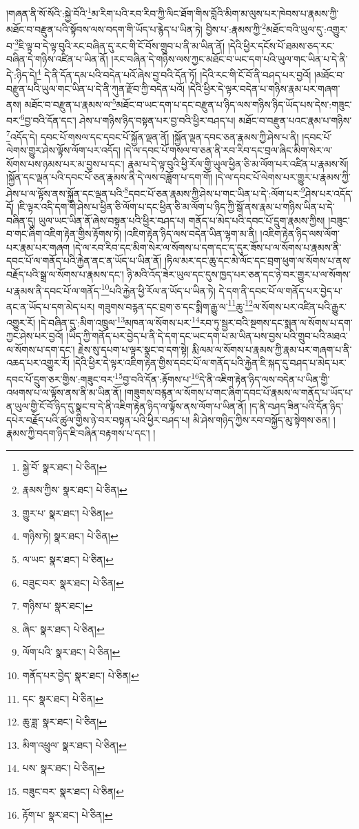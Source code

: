 །གཞན་ནི་སོ་སོའི་:སྐྱེ་བོའི་\footnote{སྐྱེ་བོ་  སྣར་ཐང་།  པེ་ཅིན། }མ་རིག་པའི་རབ་རིབ་ཀྱི་ལིང་ཐོག་གིས་བློའི་མིག་མ་ལུས་པར་ཁེབས་པ་རྣམས་ཀྱི་མཐོང་བ་བརྫུན་པའི་སྟོབས་ལས་བདག་གི་ཡོད་པ་རྙེད་པ་ཡིན་ཏེ། བྱིས་པ་:རྣམས་ཀྱི་\footnote{རྣམས་ཀྱིས་  སྣར་ཐང་།  པེ་ཅིན། }མཐོང་བའི་ཡུལ་དུ་:འགྱུར་བ་\footnote{གྱུར་པ་  སྣར་ཐང་།  པེ་ཅིན། }ཇི་ལྟ་བ་དེ་ལྟ་བུའི་རང་བཞིན་དུ་རང་གི་ངོ་བོས་གྲུབ་པ་ནི་མ་ཡིན་ནོ། །དེའི་ཕྱིར་དངོས་པོ་ཐམས་ཅད་རང་བཞིན་དེ་གཉིས་འཛིན་པ་ཡིན་ནོ། །རང་བཞིན་དེ་གཉིས་ལས་ཀྱང་མཐོང་བ་ཡང་དག་པའི་ཡུལ་གང་ཡིན་པ་དེ་ནི་དེ་:ཉིད་དེ།\footnote{གཉིས་ཏེ།  སྣར་ཐང་།  པེ་ཅིན། } དེ་ནི་དོན་དམ་པའི་བདེན་པའོ་ཞེས་བྱ་བའི་དོན་ཏོ། །དེའི་རང་གི་ངོ་བོ་ནི་བཤད་པར་བྱའོ། །མཐོང་བ་བརྫུན་པའི་ཡུལ་གང་ཡིན་པ་དེ་ནི་ཀུན་རྫོབ་ཀྱི་བདེན་པའོ། །དེའི་ཕྱིར་དེ་ལྟར་བདེན་པ་གཉིས་རྣམ་པར་གཞག་ནས། མཐོང་བ་བརྫུན་པ་རྣམས་ལ་\footnote{ལ་ཡང་  སྣར་ཐང་།  པེ་ཅིན། }མཐོང་བ་ཡང་དག་པ་དང་བརྫུན་པ་ཉིད་ལས་གཉིས་ཉིད་ཡོད་པས་དེས་:གཟུང་བར་\footnote{བཟུང་བར་  སྣར་ཐང་།  པེ་ཅིན། }བྱ་བའི་དོན་དང་། ཤེས་པ་གཉིས་ཉིད་བསྟན་པར་བྱ་བའི་ཕྱིར་བཤད་པ། མཐོང་བ་བརྫུན་པའང་རྣམ་པ་གཉིས་\footnote{གཉིས་པ་  སྣར་ཐང་། }འདོད་དེ། དབང་པོ་གསལ་དང་དབང་པོ་སྐྱོན་ལྡན་ནོ། །སྐྱོན་ལྡན་དབང་ཅན་རྣམས་ཀྱི་ཤེས་པ་ནི། །དབང་པོ་ལེགས་གྱུར་ཤེས་ལྟོས་ལོག་པར་འདོད། །དེ་ལ་དབང་པོ་གསལ་བ་ཅན་ནི་རབ་རིབ་དང་བྲལ་ཞིང་མིག་སེར་ལ་སོགས་པས་ཉམས་པར་མ་བྱས་པ་དང་། རྣམ་པ་དེ་ལྟ་བུའི་ཕྱི་རོལ་གྱི་ཡུལ་ཕྱིན་ཅི་མ་ལོག་པར་འཛིན་པ་རྣམས་སོ། །སྐྱོན་དང་ལྡན་པའི་དབང་པོ་ཅན་རྣམས་ནི་དེ་ལས་བཟློག་པ་དག་གོ། །དེ་ལ་དབང་པོ་ལེགས་པར་གྱུར་པ་རྣམས་ཀྱི་ཤེས་པ་ལ་ལྟོས་ནས་སྐྱོན་དང་ལྡན་པའི་\footnote{ཞིང་  སྣར་ཐང་།  པེ་ཅིན། }དབང་པོ་ཅན་རྣམས་ཀྱི་ཤེས་པ་གང་ཡིན་པ་དེ་:ལོག་པར་\footnote{ལོག་པའི་  སྣར་ཐང་།  པེ་ཅིན། }ཤེས་པར་འདོད་དོ། །ཇི་ལྟར་འདི་དག་གི་ཤེས་པ་ཕྱིན་ཅི་ལོག་པ་དང་ཕྱིན་ཅི་མ་ལོག་པ་ཉིད་ཀྱི་སྒོ་ནས་རྣམ་པ་གཉིས་ཡིན་པ་དེ་བཞིན་དུ། ཡུལ་ཡང་ཡིན་ནོ་ཞེས་བསྟན་པའི་ཕྱིར་བཤད་པ། གནོད་པ་མེད་པའི་དབང་པོ་དྲུག་རྣམས་ཀྱིས། །བཟུང་བ་གང་ཞིག་འཇིག་རྟེན་གྱིས་རྟོགས་ཏེ། །འཇིག་རྟེན་ཉིད་ལས་བདེན་ཡིན་ལྷག་མ་ནི། །འཇིག་རྟེན་ཉིད་ལས་ལོག་པར་རྣམ་པར་གཞག །དེ་ལ་རབ་རིབ་དང་མིག་སེར་ལ་སོགས་པ་དག་དང་ད་དུར་ཟོས་པ་ལ་སོགས་པ་རྣམས་ནི་དབང་པོ་ལ་གནོད་པའི་རྐྱེན་ནང་ན་ཡོད་པ་ཡིན་ནོ། །ཏིལ་མར་དང་ཆུ་དང་མེ་ལོང་དང་བྲག་ཕུག་ལ་སོགས་པ་ནས་བརྗོད་པའི་སྒྲ་ལ་སོགས་པ་རྣམས་དང་། ཉི་མའི་འོད་ཟེར་ཡུལ་དང་དུས་ཁྱད་པར་ཅན་དང་ཉེ་བར་གྱུར་པ་ལ་སོགས་པ་རྣམས་ནི་དབང་པོ་ལ་གནོད་\footnote{གནོད་པར་བྱེད་  སྣར་ཐང་།  པེ་ཅིན། }པའི་རྐྱེན་ཕྱི་རོལ་ན་ཡོད་པ་ཡིན་ཏེ། དེ་དག་ནི་དབང་པོ་ལ་གནོད་པར་བྱེད་པ་ནང་ན་ཡོད་པ་དག་མེད་པར། གཟུགས་བརྙན་དང་བྲག་ཅ་དང་སྨིག་རྒྱུ་ལ་\footnote{དང་  སྣར་ཐང་།  པེ་ཅིན། }ཆུ་\footnote{ཆུ་ཟླ་  སྣར་ཐང་།  པེ་ཅིན། }ལ་སོགས་པར་འཛིན་པའི་རྒྱུར་འགྱུར་རོ། །དེ་བཞིན་དུ་:མིག་འཁྲུལ་\footnote{མིག་འཕྲུལ་  སྣར་ཐང་།  པེ་ཅིན། }མཁན་ལ་སོགས་པར་\footnote{པས་  སྣར་ཐང་།  པེ་ཅིན། }རབ་ཏུ་སྦྱར་བའི་སྔགས་དང་སྨན་ལ་སོགས་པ་དག་ཀྱང་ཤེས་པར་བྱའོ། །ཡིད་ཀྱི་གནོད་པར་བྱེད་པ་ནི་དེ་དག་དང་ཡང་དག་པ་མ་ཡིན་པས་བྱས་པའི་གྲུབ་པའི་མཐའ་ལ་སོགས་པ་དག་དང་། རྗེས་སུ་དཔག་པ་ལྟར་སྣང་བ་དག་སྟེ། རྨི་ལམ་ལ་སོགས་པ་རྣམས་ཀྱི་རྣམ་པར་གཞག་པ་ནི་འཆད་པར་འགྱུར་རོ། །དེའི་ཕྱིར་དེ་ལྟར་འཇིག་རྟེན་གྱིས་དབང་པོ་ལ་གནོད་པའི་རྐྱེན་ཇི་སྐད་དུ་བཤད་པ་མེད་པར་དབང་པོ་དྲུག་ཅར་གྱིས་:གཟུང་བར་\footnote{བཟུང་བར་  སྣར་ཐང་།  པེ་ཅིན། }བྱ་བའི་དོན་:རྟོགས་པ་\footnote{རྟོག་པ་  སྣར་ཐང་།  པེ་ཅིན། }དེ་ནི་འཇིག་རྟེན་ཉིད་ལས་བདེན་པ་ཡིན་གྱི་འཕགས་པ་ལ་ལྟོས་ནས་ནི་མ་ཡིན་ནོ། །གཟུགས་བརྙན་ལ་སོགས་པ་གང་ཞིག་དབང་པོ་རྣམས་ལ་གནོད་པ་ཡོད་པ་ན་ཡུལ་གྱི་ངོ་བོ་ཉིད་དུ་སྣང་བ་དེ་ནི་འཇིག་རྟེན་ཉིད་ལ་ལྟོས་ནས་ལོག་པ་ཡིན་ནོ། །ད་ནི་བཤད་ཟིན་པའི་དོན་ཉིད་དཔེར་བརྗོད་པའི་ཚུལ་གྱིས་ཉེ་བར་བསྟན་པའི་ཕྱིར་བཤད་པ། མི་ཤེས་གཉིད་ཀྱིས་རབ་བསྐྱོད་མུ་སྟེགས་ཅན། །རྣམས་ཀྱི་བདག་ཉིད་ཇི་བཞིན་བརྟགས་པ་དང་། །

